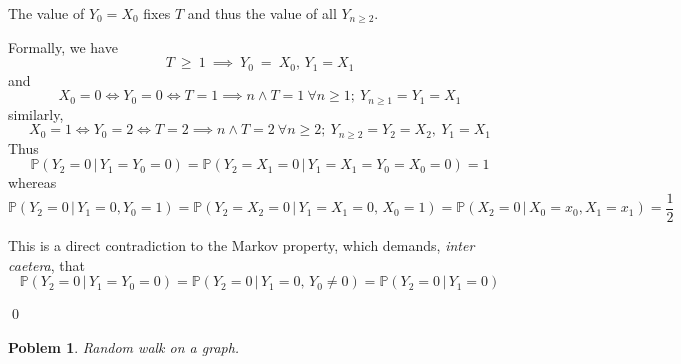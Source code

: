 \documentclass[8pt,notitlepage]{report}
\newtheorem{problem}{Poblem}
\newenvironment{solution}[1][Solution]{\begin{trivlist}
    \item[\hskip \labelsep {\bfseries #1}]}{\end{trivlist}}
\newcommand{\PP}{\mathbb{P}}
\begin{document}
\begin{solution}

The value of $Y_0 = X_0$ fixes $T$ and thus the value of all $Y_{n \geq 2}$.


Formally, we have
$$
 T~\ge~1~\implies~Y_0~=~X_0,\, Y_1 = X_1
$$
and 
\small
$$
 X_0 = 0 \iff Y_0 = 0 \iff T=1 \implies n \wedge T = 1 \  \forall n \geq 1 ;\   Y_{n\geq 1} = Y_1 = X_1
$$
\normalsize
similarly,
\small
$$
 X_0 = 1 \iff Y_0 = 2 \iff T=2 \implies n \wedge T = 2 \  \forall n \geq 2 ;\  Y_{n\geq 2} = Y_2 = X_2,\ Y_1 = X_1
$$
\normalsize
Thus
$$
\PP(Y_2=0\,|\,Y_1=Y_0=0) = \PP(Y_2=X_1=0\,|\,Y_1=X_1=Y_0=X_0=0) = 1
$$
whereas
\tiny
$$
\PP(Y_2=0\,|\,Y_1=0,Y_0=1) = \PP(Y_2=X_2=0\,|\,Y_1=X_1=0,\,X_0=1) = \PP(X_2=0\,|\,X_0=x_0,X_1=x_1) = \frac{1}{2}
$$
\normalsize

This is a direct contradiction to the Markov property, which demands, {\it inter caetera}, that
$$
 \PP(Y_2=0\, |\, Y_1=Y_0=0 ) = \PP(Y_2=0\,|\, Y_1=0,\,Y_0\neq0) = \PP(Y_2=0\,|\,Y_1=0)
$$

\qed
\end{solution}


\begin{problem} Random walk on a graph.

\end{problem}
\end{document}
